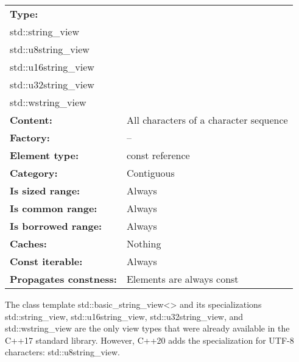 
\begin{longtable}[c]{|l|l|}
\hline
\textbf{Type:} &
\begin{tabular}[c]{@{}l@{}}std::basic\_string\_view\textless{}\textgreater\\ std::string\_view\\ std::u8string\_view\\ std::u16string\_view\\ std::u32string\_view\\ std::wstring\_view\end{tabular} \\ \hline
\endfirsthead
%
\endhead
%
\textbf{Content:}              & All characters of a character sequence \\ \hline
\textbf{Factory:}              & --                                     \\ \hline
\textbf{Element type:}         & const reference                        \\ \hline
\textbf{Category:}             & Contiguous                             \\ \hline
\textbf{Is sized range:}       & Always                                 \\ \hline
\textbf{Is common range:}      & Always                                 \\ \hline
\textbf{Is borrowed range:}    & Always                                 \\ \hline
\textbf{Caches:}               & Nothing                                \\ \hline
\textbf{Const iterable:}       & Always                                 \\ \hline
\textbf{Propagates constness:} & Elements are always const              \\ \hline
\end{longtable}

The class template std::basic\_string\_view<> and its specializations std::string\_view, std::u16string\_view, std::u32string\_view, and std::wstring\_view are the only view types that were already available in the C++17 standard library. However, C++20 adds the specialization for UTF-8 characters: std::u8string\_view.

